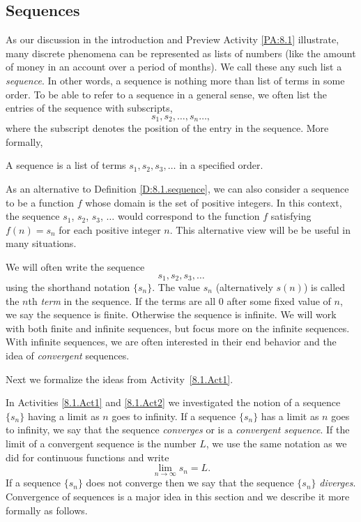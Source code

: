 

\subsection*{Sequences} 

As our discussion in the introduction and Preview Activity \ref{PA:8.1} illustrate, many discrete phenomena can be represented as lists of numbers (like the amount of money in an account over a period of months). We call these any such list a \emph{sequence}. In other words, a sequence is nothing more than list of terms in some order. To be able to refer to a sequence in a general sense, we often list the entries of the sequence with subscripts,
\[s_1, s_2, \ldots, s_n \ldots,\]
where the subscript denotes the position of the entry in the sequence. More formally,

\begin{definition} \label{D:8.1.sequence}
A sequence is a list of terms $s_1, s_2, s_3, \ldots$ in a specified order. 
\end{definition}

As an alternative to Definition \ref{D:8.1.sequence}, we can also consider a sequence to be a function $f$ whose domain is the set of positive integers. In this context, the sequence $s_1$, $s_2$, $s_3$, $\ldots$ would correspond to the function $f$ satisfying $f(n) = s_n$ for each positive integer $n$. This alternative view will be be useful in many situations. 

We will often write the sequence
\[s_1, s_2, s_3, \ldots\]
using the shorthand notation $\{s_n\}$. The value $s_n$ (alternatively $s(n)$) is called the $n$th \emph{term} in the sequence. If the terms are all 0 after some fixed value of $n$, we say the sequence is finite. Otherwise the sequence is infinite. We will work with both finite and infinite sequences, but focus more on the infinite sequences. With infinite sequences, we are often interested in their end behavior and the idea of \emph{convergent} sequences.



Next we formalize the ideas from Activity~\ref{8.1.Act1}.

\newpage



In Activities \ref{8.1.Act1} and \ref{8.1.Act2} we investigated the notion of a sequence $\{s_n\}$ having a limit as $n$ goes to infinity. If a sequence $\{s_n\}$ has a limit as $n$ goes to infinity, we say that the sequence \emph{converges} or is a \emph{convergent sequence}. If the limit of a convergent sequence is the number $L$, we use the same notation as we did for continuous functions and write
\[\lim_{n \to \infty} s_n = L.\]
If a sequence $\{s_n\}$ does not converge then we say that the sequence $\{s_n\}$ \emph{diverges}. Convergence of sequences is a major idea in this section and we describe it more formally as follows.

